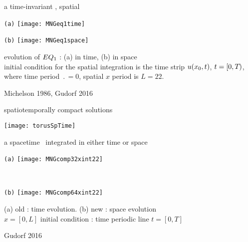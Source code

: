 \begin{frame}{a time-invariant \eqv, spatial \po}
\begin{center}
  \begin{minipage}[height=.45\textheight]{.45\textwidth}
    \centering \small{\texttt{(a)}}
    \texttt{[image: MNGeq1time]}
  \end{minipage}
  \begin{minipage}[height=.45\textheight]{.45\textwidth}
    \centering \small{\texttt{(b)}}
    \texttt{[image: MNGeq1space]}
  \end{minipage}
\end{center}
  evolution of $EQ_{1}$ : (a) in time, (b) in space
   \\
   initial condition for the spatial integration is the time strip
   $u(x_0,t)$, $t = [0,{T_{}})$, where time period
   $\period{} =0$, spatial $x$ period is $L=22$.

\vfill\hfill        Michelson 1986, Gudorf 2016
\end{frame}

\begin{frame}{spatiotemporally compact solutions}
\begin{center}
\texttt{[image: torusSpTime]}
\end{center}
\end{frame}

\begin{frame}{a spacetime \twot\ integrated in either time or space}
\begin{center}
  \begin{minipage}[height=.40\textheight]{.35\textwidth}
    \centering \small{\texttt{(a)}}
    \texttt{[image: MNGcomp32xint22]}
  \end{minipage}
~~~~~~~~~
  \begin{minipage}[height=.40\textheight]{.35\textwidth}
    \centering \small{\texttt{(b)}}
    \texttt{[image: MNGcomp64xint22]}
  \end{minipage}
\end{center}
    (a) old : time evolution. (b) new : space evolution
    \\
    $x=[0,L]$ %
       initial condition : time periodic line $t = [0,T]$

\vfill\hfill        Gudorf 2016
\end{frame}

